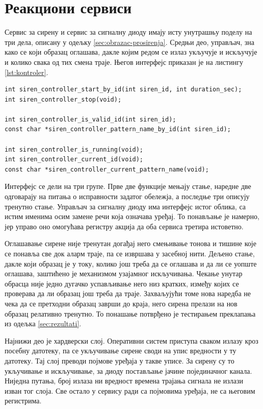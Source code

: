 \documentclass[12pt,oneside]{memoir}
\begin{document}
\section{Реакциони сервиси}
\label{sec:impl-reakcioni}

Сервис за сирену и сервис за сигналну диоду имају исту унутрашњу поделу на три дела, описану
у одељку \ref{sec:obrazac-prosirenja}. Средњи део, управљач, зна како се који образац
оглашава, дакле којим редом се излаз укључује и искључује и колико свака од тих смена траје.
Његов интерфејс приказан је на листингу \ref{lst:kontroler}.

\begin{lstlisting}[caption={Јавни интерфејс дела који управља обрасцима оглашавања
сирене},label={lst:kontroler}]
int siren_controller_start_by_id(int siren_id, int duration_sec);
int siren_controller_stop(void);

int siren_controller_is_valid_id(int siren_id);
const char *siren_controller_pattern_name_by_id(int siren_id);

int siren_controller_is_running(void);
int siren_controller_current_id(void);
const char *siren_controller_current_pattern_name(void);
\end{lstlisting}

Интерфејс се дели на три групе. Прве две функције мењају стање, наредне две одговарају на
питања о исправности задатог обележја, а последње три описују тренутно стање. Управљач за
сигналну диоду има интерфејс истог облика, са истим именима осим замене речи која означава
уређај. То понављање је намерно, јер управо оно омогућава регистру акција да оба сервиса
третира истоветно.

Оглашавање сирене није тренутан догађај него смењивање тонова и тишине које се понавља све
док аларм траје, па се извршава у засебној нити. Дељено стање, дакле који образац је у току,
колико још треба да се оглашава и да ли се уопште оглашава, заштићено је механизмом
узајамног искључивања. Чекање унутар обрасца није једно дугачко успављивање него низ
кратких, између којих се проверава да ли образац још треба да траје. Захваљујући томе нова
наредба не чека да се претходни образац заврши до краја, него сирена прелази на нов образац
релативно тренутно. То понашање потврђено је тестирањем преклапања из одељка
\ref{sec:rezultati}.

Најнижи део је хардверски слој. Оперативни систем приступа сваком излазу кроз посебну
датотеку, па се укључивање сирене своди на упис вредности у ту датотеку. Тај слој преводи
појмове уређаја у такве уписе. За сирену су то укључивање и искључивање, за
диоду постављање јачине појединачног канала. Ниједна путања, број излаза ни вредност
времена трајања сигнала не излази изван тог слоја. Све остало у сервису ради са појмовима
уређаја, не са његовим регистрима.
\end{document}
